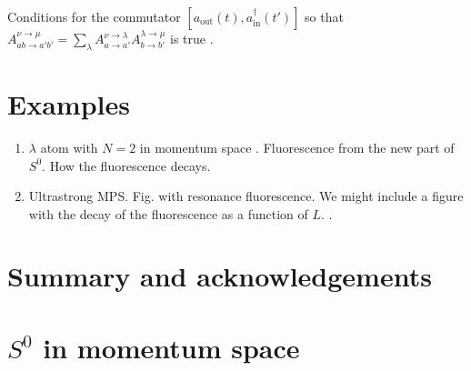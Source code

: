 \documentclass[aps,pra,reprint,amsmath,amssymb]{revtex4-1}
\begin{document}
{\color{blue} Conditions for the commutator $[a_\text{out}(t),a_\text{in}^\dagger(t')]$ so that $A_{ab\to a'b'}^{\nu\to\mu} = \sum_\lambda A_{a\to a'}^{\nu\to\lambda}A_{b\to b'}^{\lambda\to\mu}$ is true \cite{Xu2015}.
}

\section{Examples}

{\color{blue}
\begin{enumerate}
\item $\lambda$ atom with $N=2$ in momentum space \cite{Xu2016}. Fluorescence from the new part of $S^0$. How the fluorescence decays.
\item Ultrastrong MPS. Fig. with resonance fluorescence. We might include a figure with the decay of the fluorescence as a function of $L$. \cite{Sanchez-Burillo2014,Sanchez-Burillo2015}.
\end{enumerate}
}

\section{Summary and acknowledgements}

\appendix

\section{$S^0$ in momentum space}\label{app:Sp}
\end{document}
